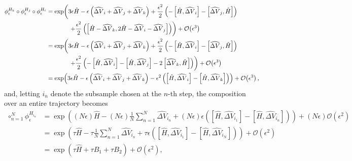 \documentclass{article}
\begin{document}
\begin{align*}
\phi^{H_{k}}_{\epsilon} \circ \phi^{H_{j}}_{\epsilon} \circ \phi^{H_{i}}_{\epsilon}
&=
\exp \! \left( 
3 \epsilon \hat{H} 
- \epsilon \left( \widehat{ \Delta V}_{i} +  \widehat{ \Delta V}_{j} +  \widehat{ \Delta V}_{k} \right)
+ \frac{\epsilon^{2}}{2} \left(
- \left[ \hat{H}, \widehat{ \Delta V}_{i} \right]
- \left[ \widehat{ \Delta V}_{j}, \hat{H} \right] \right) \right.
\\
& \hspace{13mm} \left.
+ \frac{\epsilon^{2}}{2} \left(
\left[ \hat{H} - \widehat{ \Delta V}_{k}, 2 \hat{H} - \widehat{ \Delta V}_{i} - \widehat{ \Delta V}_{j} \right]
\right)
\right)
+ \mathcal{O} \! \left( \epsilon^{3} \right)
\\
&=
\exp \! \left( 
3 \epsilon \hat{H} 
- \epsilon \left( \widehat{ \Delta V}_{i} + \widehat{ \Delta V}_{j} + \widehat{ \Delta V}_{k} \right)
+ \frac{\epsilon^{2}}{2} \left(
- \left[ \hat{H}, \widehat{ \Delta V}_{i} \right]
- \left[ \widehat{ \Delta V}_{j}, \hat{H} \right] \right) \right.
\\
& \hspace{13mm} \left.
+ \frac{\epsilon^{2}}{2} \left(
- \left[ \hat{H}, \widehat{ \Delta V}_{i} \right]
- \left[ \hat{H}, \widehat{ \Delta V}_{j} \right]
- 2 \left[ \widehat{ \Delta V}_{k}, \hat{H} \right] \right) \right)
+ \mathcal{O} \! \left( \epsilon^{3} \right)
\\
&=
\exp \! \left( 
3 \epsilon \hat{H} 
- \epsilon \left( \widehat{ \Delta V}_{i} + \widehat{ \Delta V}_{j} + \widehat{ \Delta V}_{k} \right)
- \epsilon^{2} \left( \left[ \hat{H}, \widehat{ \Delta V}_{i} \right] 
- \left[ \hat{H}, \widehat{ \Delta V}_{k} \right] \right)
\right) + \mathcal{O} \! \left( \epsilon^{3} \right),
\end{align*}
%
and, letting $i_{n}$ denote the subsample chosen at the $n$-th step, the composition over
an entire trajectory becomes
%
\begin{align*}
\circ_{n = 1}^{N} \phi^{H_{i_{n}}}_{\epsilon}
&=
\exp \! \left( 
\left( N \epsilon \right) \hat{H} 
- \left( N \epsilon \right) \frac{1}{N} \sum_{n = 1}^{N}  \widehat{ \Delta V}_{i_{n}}
+ \left( N \epsilon \right) \epsilon 
\left( \left[ \hat{H}, \widehat{ \Delta V}_{i_{1}} \right] 
- \left[ \hat{H}, \widehat{ \Delta V}_{i_{n}} \right] \right) 
\right)
+ \left(N \epsilon \right) \mathcal{O} \! \left( \epsilon^{2} \right)
\\
&=
\exp \! \left( \tau \hat{H} - \tau \frac{1}{N} \sum_{n = 1}^{N} \widehat{ \Delta V}_{i_{n}}
+ \tau \epsilon 
\left( \left[ \hat{H}, \widehat{ \Delta V}_{i_{1}} \right] 
- \left[ \hat{H}, \widehat{ \Delta V}_{i_{N}} \right] \right)
\right)
+ \mathcal{O} \! \left( \epsilon^{2} \right)
\\
&=
\exp \! \left( \tau \hat{H} + \tau B_{1} + \tau B_{2} \right)
+ \mathcal{O} \! \left( \epsilon^{2} \right),
\end{align*}
\end{document}
